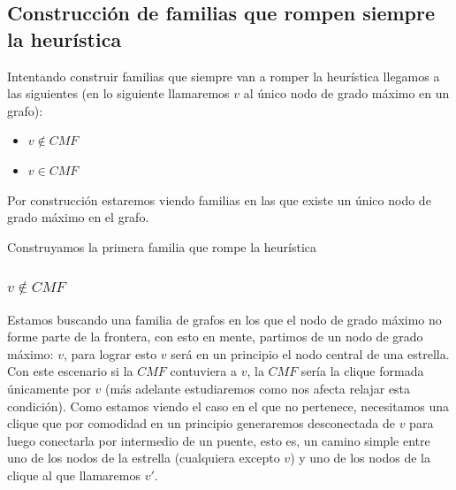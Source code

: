 %
%
%			
%
%
%
%			

\subsection{Construcci\'on de familias que rompen siempre la heur\'istica}

Intentando construir familias que siempre van a romper la heur\'istica llegamos a las siguientes
(en lo siguiente llamaremos $v$ al \'unico nodo de grado m\'aximo en un grafo):
\begin{itemize}
	\item{$v \notin CMF$}
	\item{$v \in CMF$}
\end{itemize}

Por construcci\'on estaremos viendo familias en las que existe un \'unico nodo de grado m\'aximo en el grafo.

Construyamos la primera familia que rompe la heur\'istica

\subsubsection{$v \notin CMF$}

Estamos buscando una familia de grafos en los que el nodo de grado m\'aximo no forme parte de la 
frontera, con esto en mente, partimos de un nodo de grado m\'aximo: $v$, para lograr esto $v$ ser\'a
en un principio el nodo central de una estrella. Con este escenario si la $CMF$ contuviera a $v$, la
$CMF$ ser\'ia la clique formada \'unicamente por $v$ (m\'as adelante estudiaremos como nos afecta 
relajar esta condici\'on). Como estamos viendo el caso en el que no pertenece, necesitamos una clique 
que por comodidad en un principio generaremos desconectada de $v$ para luego conectarla por 
intermedio de un puente, esto es, un camino simple entre uno de los nodos de la estrella (cualquiera
excepto $v$) y uno de los nodos de la clique al que llamaremos $v'$. 

